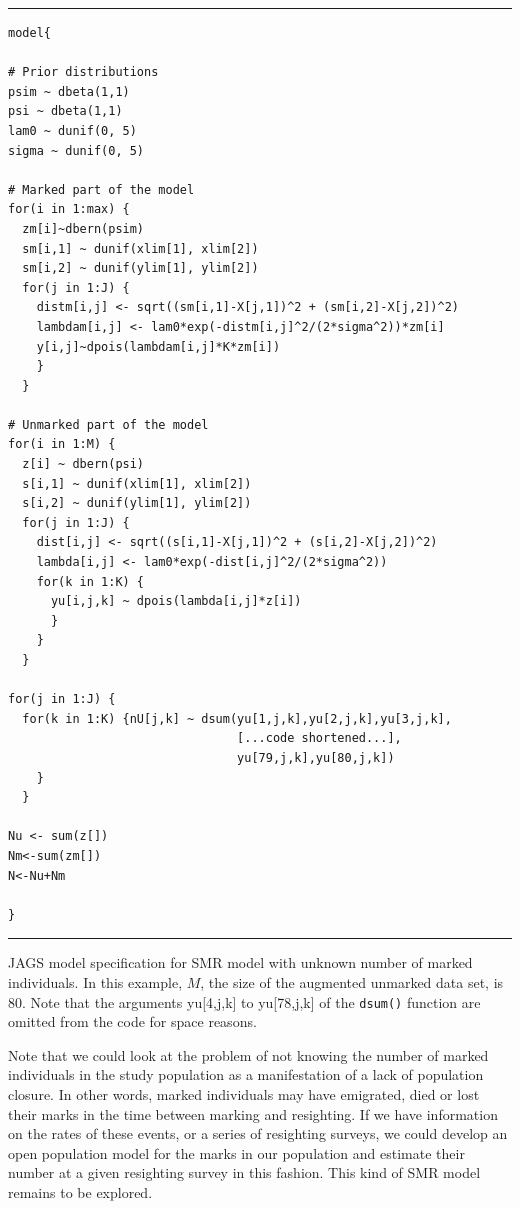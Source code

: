 \begin{panel}[htp]
\centering
\rule[0.15in]{\textwidth}{.03in}
{\small
\begin{verbatim}
model{

# Prior distributions
psim ~ dbeta(1,1)
psi ~ dbeta(1,1)
lam0 ~ dunif(0, 5)
sigma ~ dunif(0, 5)

# Marked part of the model
for(i in 1:max) {
  zm[i]~dbern(psim)
  sm[i,1] ~ dunif(xlim[1], xlim[2])
  sm[i,2] ~ dunif(ylim[1], ylim[2])
  for(j in 1:J) {
    distm[i,j] <- sqrt((sm[i,1]-X[j,1])^2 + (sm[i,2]-X[j,2])^2)
    lambdam[i,j] <- lam0*exp(-distm[i,j]^2/(2*sigma^2))*zm[i]
    y[i,j]~dpois(lambdam[i,j]*K*zm[i])
    }
  }

# Unmarked part of the model
for(i in 1:M) {
  z[i] ~ dbern(psi)
  s[i,1] ~ dunif(xlim[1], xlim[2])
  s[i,2] ~ dunif(ylim[1], ylim[2])
  for(j in 1:J) {
    dist[i,j] <- sqrt((s[i,1]-X[j,1])^2 + (s[i,2]-X[j,2])^2)
    lambda[i,j] <- lam0*exp(-dist[i,j]^2/(2*sigma^2))
    for(k in 1:K) {
      yu[i,j,k] ~ dpois(lambda[i,j]*z[i])
      }
    }
  }

for(j in 1:J) {
  for(k in 1:K) {nU[j,k] ~ dsum(yu[1,j,k],yu[2,j,k],yu[3,j,k],
								[...code shortened...],
								yu[79,j,k],yu[80,j,k])
	}
  }

Nu <- sum(z[])
Nm<-sum(zm[])
N<-Nu+Nm

}
\end{verbatim}
}
\rule[-0.15in]{\textwidth}{.03in}
\caption{
JAGS model specification for SMR model with unknown number of marked individuals. In this example, $M$, the size of the augmented unmarked data set, is 80. Note that the arguments yu[4,j,k] to yu[78,j,k] of the {\tt dsum()} function are omitted from the code for space reasons.
}
\label{partialID.panel.unknownm}
\end{panel}

Note that we could look at the problem of not knowing the number of
marked individuals in the study population as a manifestation of a
lack of population closure. In other words, marked individuals may
have emigrated, died or lost their marks in the time between marking
and resighting. If we have information on the rates of these events,
or a series of resighting surveys, we could develop an open population
model for the marks in our population and estimate their number at a
given resighting survey in this fashion. This kind of SMR model
remains to be explored.

